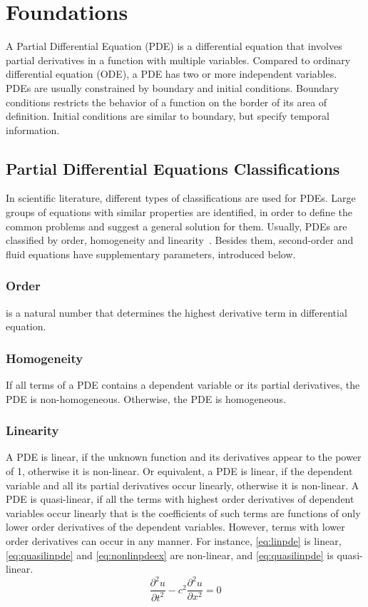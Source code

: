 \section{Foundations}
\label{sec:foundations}
A Partial Differential Equation (PDE) is a differential equation that involves partial derivatives in a function with multiple variables. Compared to ordinary differential equation (ODE), a PDE has two or more independent variables. PDEs are usually constrained by boundary and initial conditions. Boundary conditions restricts the behavior of a function on the border of its area of definition. Initial conditions are similar to boundary, but specify temporal information.  

\subsection{Partial Differential Equations Classifications}
In scientific literature, different types of classifications are used for PDEs. Large groups of equations with similar properties are identified, in order to define the common problems and suggest a general solution for them. Usually, PDEs are classified by order, homogeneity and linearity~\cite{pdesum}. Besides them, second-order and fluid equations have supplementary parameters, introduced below.

\subsubsection{Order} is a natural number that determines the highest derivative term in differential equation.

\subsubsection{Homogeneity} If all terms of a PDE contains a dependent variable or its partial derivatives, the PDE is non-homogeneous. Otherwise, the PDE is homogeneous.

\subsubsection{Linearity} A PDE is linear, if the unknown function and its derivatives appear to the power of 1, otherwise it is non-linear. Or equivalent, a PDE is linear, if the dependent variable and all its partial derivatives occur linearly, otherwise it is non-linear. A PDE is quasi-linear, if all the terms with highest order derivatives of dependent variables occur linearly that is the coefficients of such terms are functions of only lower order derivatives of the dependent variables. However, terms with lower order derivatives can occur in any manner. For instance, \cref{eq:linpde} is linear, \cref{eq:quasilinpde} and \cref{eq:nonlinpdeex} are non-linear, and \cref{eq:quasilinpde} is quasi-linear.
\begin{equation}
\frac{\partial^{2} u}{\partial t^{2}}-c^{2} \frac{\partial^{2} u}{\partial x^{2}}=0
\label{eq:linpde}
\end{equation}

